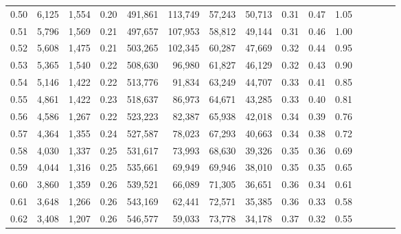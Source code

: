 \begin{tabular}{rrrcrrrrrrrrrrr}
0.50 &   6,125 &  1,554 &                                       0.20 &  491,861 &  113,749 &   57,243 &   50,713 &  0.31 &  0.47 &                         1.05 \\
0.51 &   5,796 &  1,569 &                                       0.21 &  497,657 &  107,953 &   58,812 &   49,144 &  0.31 &  0.46 &                         1.00 \\
0.52 &   5,608 &  1,475 &                                       0.21 &  503,265 &  102,345 &   60,287 &   47,669 &  0.32 &  0.44 &                         0.95 \\
0.53 &   5,365 &  1,540 &                                       0.22 &  508,630 &   96,980 &   61,827 &   46,129 &  0.32 &  0.43 &                         0.90 \\
0.54 &   5,146 &  1,422 &                                       0.22 &  513,776 &   91,834 &   63,249 &   44,707 &  0.33 &  0.41 &                         0.85 \\
0.55 &   4,861 &  1,422 &                                       0.23 &  518,637 &   86,973 &   64,671 &   43,285 &  0.33 &  0.40 &                         0.81 \\
0.56 &   4,586 &  1,267 &                                       0.22 &  523,223 &   82,387 &   65,938 &   42,018 &  0.34 &  0.39 &                         0.76 \\
0.57 &   4,364 &  1,355 &                                       0.24 &  527,587 &   78,023 &   67,293 &   40,663 &  0.34 &  0.38 &                         0.72 \\
0.58 &   4,030 &  1,337 &                                       0.25 &  531,617 &   73,993 &   68,630 &   39,326 &  0.35 &  0.36 &                         0.69 \\
0.59 &   4,044 &  1,316 &                                       0.25 &  535,661 &   69,949 &   69,946 &   38,010 &  0.35 &  0.35 &                         0.65 \\
0.60 &   3,860 &  1,359 &                                       0.26 &  539,521 &   66,089 &   71,305 &   36,651 &  0.36 &  0.34 &                         0.61 \\
0.61 &   3,648 &  1,266 &                                       0.26 &  543,169 &   62,441 &   72,571 &   35,385 &  0.36 &  0.33 &                         0.58 \\
0.62 &   3,408 &  1,207 &                                       0.26 &  546,577 &   59,033 &   73,778 &   34,178 &  0.37 &  0.32 &                         0.55 \\

\end{tabular}
